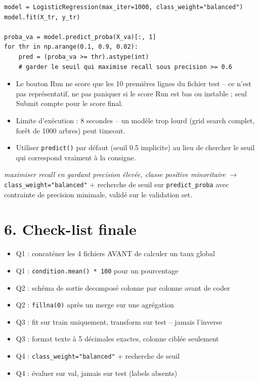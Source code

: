 \documentclass[11pt]{article}
\begin{document}
\begin{lstlisting}
model = LogisticRegression(max_iter=1000, class_weight="balanced")
model.fit(X_tr, y_tr)

proba_va = model.predict_proba(X_va)[:, 1]
for thr in np.arange(0.1, 0.9, 0.02):
    pred = (proba_va >= thr).astype(int)
    # garder le seuil qui maximise recall sous precision >= 0.6
\end{lstlisting}

\begin{trap}
\begin{itemize}[nosep]
  \item Le bouton Run ne score que les 10 premi\`eres lignes du fichier
        test -- ce n'est pas repr\'esentatif, ne pas paniquer si le score
        Run est bas ou instable ; seul Submit compte pour le score final.
  \item Limite d'ex\'ecution : 8 secondes -- un mod\`ele trop lourd
        (grid search complet, for\^et de 1000 arbres) peut timeout.
  \item Utiliser \texttt{predict()} par d\'efaut (seuil 0.5 implicite) au
        lieu de chercher le seuil qui correspond vraiment \`a la consigne.
\end{itemize}
\end{trap}

\begin{pat}
\emph{\og maximiser recall en gardant precision \'elev\'ee, classe
positive minoritaire \fg} $\to$ \texttt{class\_weight="balanced"} +
recherche de seuil sur \texttt{predict\_proba} avec contrainte de
precision minimale, valid\'e sur le validation set.
\end{pat}

\section{6. Check-list finale}
\begin{itemize}[nosep]
  \item[$\square$] Q1 : concat\'ener les 4 fichiers AVANT de calculer un taux global
  \item[$\square$] Q1 : \texttt{condition.mean() * 100} pour un pourcentage
  \item[$\square$] Q2 : sch\'ema de sortie decompos\'e colonne par colonne avant de coder
  \item[$\square$] Q2 : \texttt{fillna(0)} apr\`es un merge sur une agr\'egation
  \item[$\square$] Q3 : fit sur train uniquement, transform sur test -- jamais l'inverse
  \item[$\square$] Q3 : format texte \`a 5 d\'ecimales exactes, colonne cibl\'ee seulement
  \item[$\square$] Q4 : \texttt{class\_weight="balanced"} + recherche de seuil
  \item[$\square$] Q4 : \'evaluer sur val, jamais sur test (labels absents)
\end{itemize}
\end{document}
